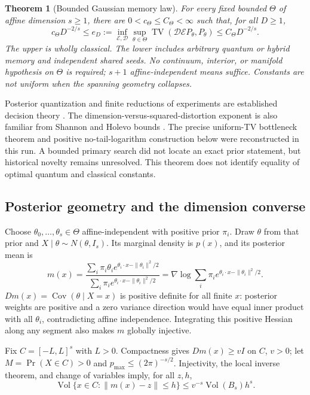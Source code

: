 \documentclass[11pt]{article}
\newtheorem{theorem}{Theorem}[section]
\theoremstyle{definition}
\DeclareMathOperator{\TV}{TV}
\DeclareMathOperator{\Cov}{Cov}
\begin{document}
\begin{theorem}[Bounded Gaussian memory law]\label{thm:gaussian}
For every fixed bounded $\Theta$ of affine dimension $s\ge1$,
there are $0<c_\Theta\le C_\Theta<\infty$ such that, for all $D\ge1$,
\[
 c_\Theta D^{-2/s}\le
 e_D:=\inf_{\mathcal E,\mathcal D}
 \sup_{\theta\in\Theta}\TV(\mathcal D\mathcal E P_\theta,P_\theta)
 \le C_\Theta D^{-2/s}.
\]
The upper is wholly classical. The lower includes arbitrary quantum
or hybrid memory and independent shared seeds. No continuum, interior,
or manifold hypothesis on $\Theta$ is required; $s+1$ affine-independent
means suffice. Constants are not uniform when the spanning geometry
collapses.
\end{theorem}

Posterior quantization and finite reductions of experiments are
established decision theory \cite{strasser,potzelberger}.
The dimension-versus-squared-distortion exponent is also familiar
from Shannon and Holevo bounds \cite{koch,holevo,datta}.
The precise uniform-TV bottleneck theorem and positive no-tail-logarithm
construction below were reconstructed in this run. A bounded primary
search did not locate an exact prior statement, but historical
novelty remains unresolved. This theorem does not identify equality
of optimal quantum and classical constants.

\subsection{Posterior geometry and the dimension converse}
Choose $\theta_0,\ldots,\theta_s\in\Theta$ affine-independent with
positive prior $\pi_i$. Draw $\theta$ from that prior and
$X\mid\theta\sim N(\theta,I_s)$. Its marginal density is $p(x)$,
and its posterior mean is
\[
 m(x)=
 \frac{\sum_i\pi_i\theta_i e^{\theta_i\cdot x-\|\theta_i\|^2/2}}
 {\sum_i\pi_i e^{\theta_i\cdot x-\|\theta_i\|^2/2}}
 =\nabla\log\sum_i\pi_i e^{\theta_i\cdot x-\|\theta_i\|^2/2}.
\]
$Dm(x)=\Cov(\theta\mid X=x)$ is positive definite for all finite
$x$: posterior weights are positive and a zero variance direction
would have equal inner product with all $\theta_i$, contradicting
affine independence. Integrating this positive Hessian along any
segment also makes $m$ globally injective.

Fix $C=[-L,L]^s$ with $L>0$. Compactness gives
$Dm(x)\ge vI$ on $C$, $v>0$; let $M=\Pr(X\in C)>0$ and
$p_{\max}\le(2\pi)^{-s/2}$. Injectivity, the local inverse theorem,
and change of variables imply, for all $z,h$,
\[
 \operatorname{Vol}\{x\in C:\|m(x)-z\|\le h\}
 \le v^{-s}\operatorname{Vol}(B_s)h^s.
\]
\end{document}
